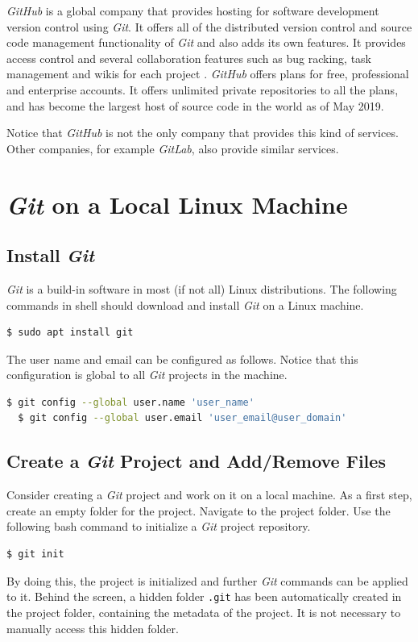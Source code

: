 \documentclass[a4paper]{article}
\begin{document}
\textit{GitHub} is a global company that provides hosting for software development version control using \textit{Git}. It offers all of the distributed version control and source code management functionality of \textit{Git} and also adds its own features. It provides access control and several collaboration features such as bug racking, task management and wikis for each project \cite{wikipediaGitHub}. \textit{GitHub} offers plans for free, professional and enterprise accounts. It offers unlimited private repositories to all the plans, and has become the largest host of source code in the world as of May 2019.

Notice that \textit{GitHub} is not the only company that provides this kind of services. Other companies, for example \textit{GitLab}, also provide similar services.

\section{\textit{Git} on a Local Linux Machine}

\subsection{Install \textit{Git}}

\textit{Git} is a build-in software in most (if not all) Linux distributions. The following commands in shell should download and install \textit{Git} on a Linux machine.
\begin{lstlisting}[backgroundcolor = \color{lightgray},language=bash]
  $ sudo apt install git
\end{lstlisting}

The user name and email can be configured as follows. Notice that this configuration is global to all \textit{Git} projects in the machine.
\begin{lstlisting}[backgroundcolor = \color{lightgray},language=bash]
  $ git config --global user.name 'user_name'
  $ git config --global user.email 'user_email@user_domain'
\end{lstlisting}

\subsection{Create a \textit{Git} Project and Add/Remove Files}

Consider creating a \textit{Git} project and work on it on a local machine. As a first step, create an empty folder for the project. Navigate to the project folder. Use the following bash command to initialize a \textit{Git} project repository.
\begin{lstlisting}[backgroundcolor = \color{lightgray},language=bash]
  $ git init
\end{lstlisting}
By doing this, the project is initialized and further \textit{Git} commands can be applied to it. Behind the screen, a hidden folder \texttt{.git} has been automatically created in the project folder, containing the metadata of the project. It is not necessary to manually access this hidden folder.
\end{document}
